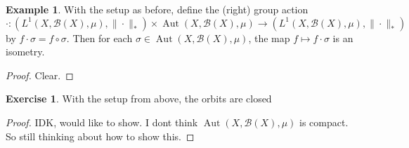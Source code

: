 \documentclass[12pt]{amsart}
\theoremstyle{definition}
\newtheorem{ex}[definition]{Exercise}
\newtheorem{exm}[definition]{Example}
\newcommand{\sig}{\sigma}
\newcommand{\MB}{\mathcal{B}}
\DeclareMathOperator{\Aut}{Aut}
\begin{document}
	\begin{exm}
	With the setup as before, define the (right) group action \\ $\cdot: (L^1(X, \MB(X), \mu), \|\cdot\|_*) \times \Aut(X, \MB(X), \mu) \rightarrow (L^1(X, \MB(X), \mu), \|\cdot\|_*) $ by $f \cdot \sig = f \circ \sig$. Then for each $\sig \in \Aut(X, \MB(X), \mu)$, the map $f \mapsto f \cdot \sig$ is an isometry. 
	\end{exm}
	
	\begin{proof}
	Clear.
	\end{proof}
	
	\begin{ex}
	With the setup from above, the orbits are closed
	\end{ex}
	
	\begin{proof}
	IDK, would like to show. I dont think $\Aut(X, \MB(X), \mu)$ is compact. So still thinking about how to show this.
	\end{proof}
	
	
\end{document}
